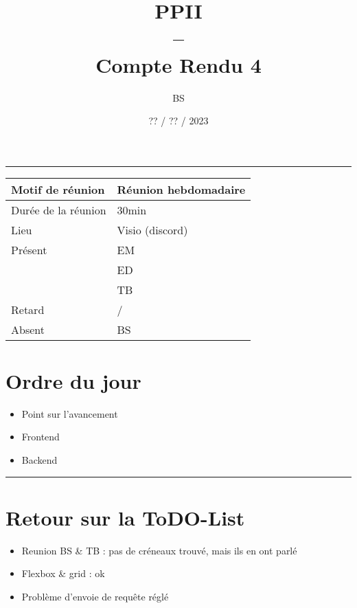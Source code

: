 \documentclass[10pt,a4paper]{report}
\title{PPII \\ -- \\ Compte Rendu 4}
\date{?? / ?? / 2023}
\author{BS}
\begin{document}
\maketitle

\tableofcontents \bigskip

\noindent\rule{\linewidth}{0.5mm} \bigskip

                \begin{tabular}{|l | l|}
                        \hline
                Motif de réunion & Réunion hebdomadaire \\
                        \hline
                Durée de la réunion & 30min \\
                        \hline
                Lieu & Visio (discord) \\
                        \hline
                Présent & EM \\
                        & ED \\
                        & TB  \\
                        \hline
                Retard  & / \\
                        \hline
                Absent  & BS \\
                        \hline
                \end{tabular}


\section{Ordre du jour}
\begin{itemize}
        \item Point sur l’avancement
        \item Frontend
        \item Backend
\end{itemize}

\noindent\rule{\linewidth}{0.5mm} \bigskip
\section{Retour sur la ToDO-List}
\begin{itemize}
        \item Reunion BS \& TB : pas de créneaux trouvé, mais ils en ont parlé
        \item Flexbox \& grid : ok
        \item Problème d’envoie de requête réglé        
\end{itemize}
\end{document}

